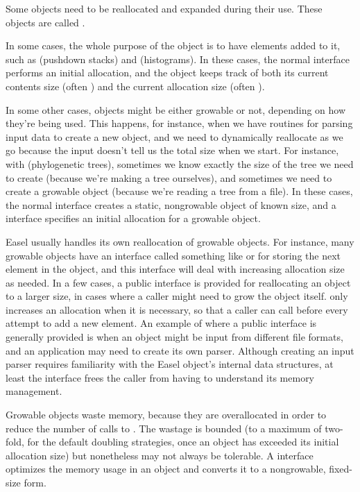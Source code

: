 Some objects need to be reallocated and expanded during their use.
These objects are called .

In some cases, the whole purpose of the object is to have elements
added to it, such as  (pushdown stacks) and
 (histograms). In these cases, the normal
 interface performs an initial allocation, and the
object keeps track of both its current contents size (often
) and the current allocation size (often
). 

In some other cases, objects might be either growable or not,
depending on how they're being used. This happens, for instance, when
we have routines for parsing input data to create a new object, and we
need to dynamically reallocate as we go because the input doesn't tell
us the total size when we start. For instance, with 
(phylogenetic trees), sometimes we know exactly the size of the tree
we need to create (because we're making a tree ourselves), and
sometimes we need to create a growable object (because we're reading a
tree from a file). In these cases, the normal 
interface creates a static, nongrowable object of known size, and a
 interface specifies an initial allocation
for a growable object.

Easel usually handles its own reallocation of growable objects. For
instance, many growable objects have an interface called something
like  or  for storing the next element
in the object, and this interface will deal with increasing allocation
size as needed.  In a few cases, a public  interface
is provided for reallocating an object to a larger size, in cases
where a caller might need to grow the object itself. 
only increases an allocation when it is necessary, so that a caller
can call  before every attempt to add a new
element. An example of where a public  interface is
generally provided is when an object might be input from different
file formats, and an application may need to create its own
parser. Although creating an input parser requires familiarity with
the Easel object's internal data structures, at least the
 interface frees the caller from having to understand
its memory management.

Growable objects waste memory, because they are overallocated in order
to reduce the number of calls to .  The wastage is
bounded (to a maximum of two-fold, for the default doubling
strategies, once an object has exceeded its initial allocation size)
but nonetheless may not always be tolerable.  A 
interface optimizes the memory usage in an object and converts it to a
nongrowable, fixed-size form. 

